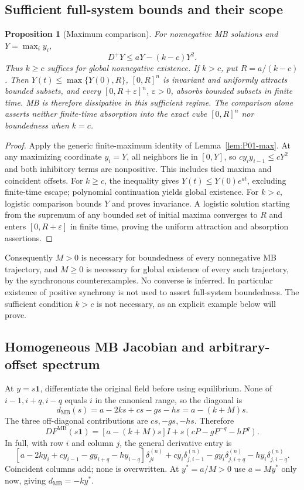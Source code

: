 \documentclass[11pt]{article}
\newcommand{\one}{\mathbf{1}}
\newcommand{\MB}{\mathrm{MB}}
\newtheorem{proposition}[theorem]{Proposition}
\theoremstyle{definition}
\theoremstyle{remark}
\begin{document}
\subsection{Sufficient full-system bounds and their scope}
\label{slot:P08-3}
\begin{proposition}[Maximum comparison]
\label{prop:P08-bounds}
For nonnegative MB solutions and $Y=\max_i y_i$,
\begin{equation}
 D^+Y\le aY-(k-c)Y^2.\label{eq:P08-maximum}
\end{equation}
Thus $k\ge c$ suffices for global nonnegative existence. If $k>c$,
put $R=a/(k-c)$. Then $Y(t)\le\max\{Y(0),R\}$, $[0,R]^n$ is
invariant and uniformly attracts bounded subsets, and every
$[0,R+\varepsilon]^n$, $\varepsilon>0$, absorbs bounded subsets in
finite time. MB is therefore dissipative in this sufficient regime.
The comparison alone asserts neither finite-time absorption into the
exact cube $[0,R]^n$ nor boundedness when $k=c$.
\end{proposition}
\begin{proof}
Apply the generic finite-maximum identity of Lemma~\ref{lem:P01-max}.
At any maximizing coordinate $y_i=Y$, all neighbors lie in $[0,Y]$,
so $cy_i y_{i-1}\le cY^2$ and both inhibitory terms are nonpositive.
This includes tied maxima and coincident offsets. For $k\ge c$, the
inequality gives $Y(t)\le Y(0)e^{at}$, excluding finite-time escape;
polynomial continuation yields global existence. For $k>c$, logistic
comparison bounds $Y$ and proves invariance. A logistic solution
starting from the supremum of any bounded set of initial maxima
converges to $R$ and enters $[0,R+\varepsilon]$ in finite time,
proving the uniform attraction and absorption assertions.
\end{proof}
Consequently $M>0$ is necessary for boundedness of every nonnegative
MB trajectory, and $M\ge0$ is necessary for global existence of every
such trajectory, by the synchronous counterexamples. No converse is
inferred. In particular existence of positive synchrony is not used to
assert full-system boundedness. The sufficient condition $k>c$ is not
necessary, as an explicit example below will prove.

\subsection{Homogeneous MB Jacobian and arbitrary-offset spectrum}
\label{slot:P08-4}
At $y=s\one$, differentiate the original field before using equilibrium.
None of $i-1,i+q,i-q$ equals $i$ in the canonical range, so the diagonal is
\[
 d_{\MB}(s)=a-2ks+cs-gs-hs=a-(k+M)s.
\]
The three off-diagonal contributions are $cs,-gs,-hs$. Therefore
\begin{equation}
 DF^{\MB}(s\one)=[a-(k+M)s]I+s(cP-gP^{-q}-hP^q).
 \label{eq:P08-state-J}
\end{equation}
In full, with row $i$ and column $j$, the general derivative entry is
\[
 [a-2ky_i+cy_{i-1}-gy_{i+q}-hy_{i-q}]\delta^{(n)}_{ji}
 +cy_i\delta^{(n)}_{j,i-1}-gy_i\delta^{(n)}_{j,i+q}
 -hy_i\delta^{(n)}_{j,i-q}.
\]
Coincident columns add; none is overwritten. At $y^*=a/M>0$ use
$a=My^*$ only now, giving $d_{\MB}=-ky^*$.
\end{document}
